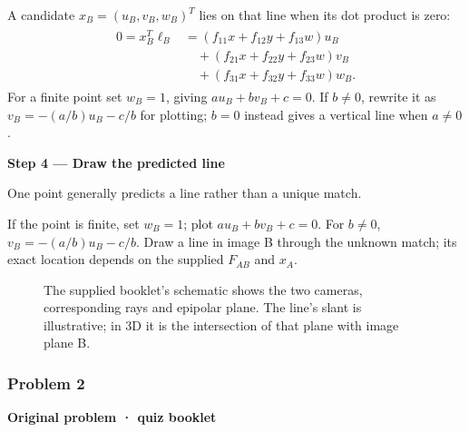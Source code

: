 \documentclass[letterpaper,11pt,english,openany,oneside]{jupyterBook}
\begin{document}
\sphinxAtStartPar
A candidate {\color{QuizMathBlue} \(x_B=(u_B,v_B,w_B)^T\)} lies on that line when its dot product is zero:
{\color{QuizMathBlue} \begin{equation*}
\begin{split}
\begin{aligned}
0=x_B^T\ell_B
&=(f_{11}x+f_{12}y+f_{13}w)u_B\\
&\quad +(f_{21}x+f_{22}y+f_{23}w)v_B\\
&\quad +(f_{31}x+f_{32}y+f_{33}w)w_B.
\end{aligned}
\end{split}
\end{equation*}}
\sphinxAtStartPar
For a finite point set {\color{QuizMathBlue} \(w_B=1\)}, giving {\color{QuizMathBlue} \(au_B+bv_B+c=0\)}. If {\color{QuizMathBlue} \(b\ne0\)}, rewrite it as {\color{QuizMathBlue} \(v_B=-(a/b)u_B-c/b\)} for plotting; {\color{QuizMathBlue} \(b=0\)} instead gives a vertical line when {\color{QuizMathBlue} \(a\ne0\)}.

\par

\par\medskip{}
{\color{QuizStepRed}\bfseries Step 4 — Draw the predicted line}\par\smallskip

\sphinxAtStartPar
{} One point generally predicts a line rather than a unique match.

\sphinxAtStartPar
If the point is finite, set {\color{QuizMathBlue} \(w_B=1\)}; plot {\color{QuizMathBlue} \(au_B+bv_B+c=0\)}. For {\color{QuizMathBlue} \(b\neq0\)}, {\color{QuizMathBlue} \(v_B=-(a/b)u_B-c/b\)}. Draw a line in image B through the unknown match; its exact location depends on the supplied {\color{QuizMathBlue} \(F_{AB}\)} and {\color{QuizMathBlue} \(x_A\)}.

\par

\begin{figure}[H]
\centering
\capstart

\noindent{}
\caption{The supplied booklet’s schematic shows the two cameras, corresponding rays and epipolar plane. The line’s slant is illustrative; in 3D it is the intersection of that plane with image plane B.}\label{\detokenize{lectures/lecture04/quiz-workbook:id6}}\end{figure}


\subsubsection{Problem 2}
\label{\detokenize{lectures/lecture04/quiz-workbook:problem-2}}\label{\detokenize{lectures/lecture04/quiz-workbook:quiz-1-q2}}
\par\medskip\textbf{Original problem · quiz booklet}\par\smallskip
\end{document}
